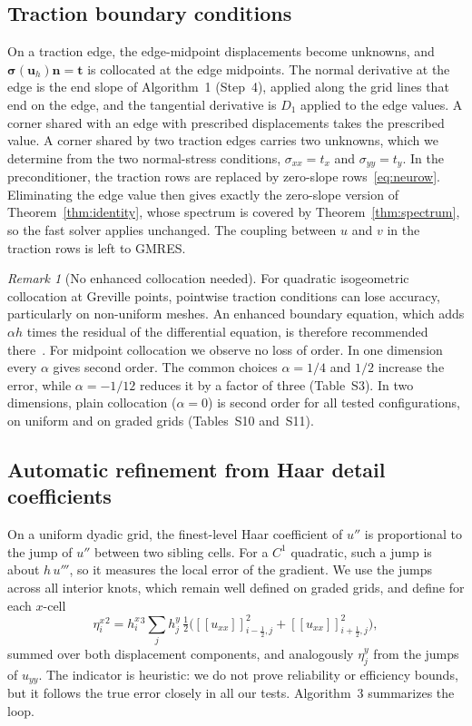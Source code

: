\documentclass[preprint,12pt]{elsarticle}
\theoremstyle{remark}
\newtheorem{remark}{Remark}
\begin{document}
\subsection{Traction boundary conditions}\label{sec:traction}
On a traction edge, the edge-midpoint displacements become unknowns, and
$\boldsymbol\sigma(\mathbf u_h)\mathbf n=\mathbf t$ is collocated at the edge midpoints. The normal
derivative at the edge is the end slope of Algorithm~1 (Step~4), applied along the grid lines that end
on the edge, and the tangential derivative is $D_1$ applied to the edge values. A corner shared with an
edge with prescribed displacements takes the prescribed value. A corner shared by two traction edges
carries two unknowns, which we determine from the two normal-stress conditions, $\sigma_{xx}=t_x$ and
$\sigma_{yy}=t_y$. In the preconditioner, the traction rows are replaced by zero-slope
rows~\eqref{eq:neurow}. Eliminating the edge value then gives exactly the zero-slope version of
Theorem~\ref{thm:identity}, whose spectrum is covered by Theorem~\ref{thm:spectrum}, so the fast solver
applies unchanged. The coupling between $u$ and $v$ in the traction rows is left to GMRES.

\begin{remark}[No enhanced collocation needed]
For quadratic isogeometric collocation at Greville points, pointwise traction conditions can lose
accuracy, particularly on non-uniform meshes. An enhanced boundary equation, which adds $\alpha h$ times
the residual of the differential equation, is therefore recommended there~\cite{delorenzis2015isogeometric}.
For midpoint collocation we observe no loss of order. In one dimension every $\alpha$ gives second order.
The common choices $\alpha=1/4$ and $1/2$ increase the error, while $\alpha=-1/12$ reduces it by a factor
of three (Table~S3). In two dimensions, plain collocation ($\alpha=0$) is second order for all
tested configurations, on uniform and on graded grids (Tables~S10
and~S11).
\end{remark}

\subsection{Automatic refinement from Haar detail coefficients}\label{sec:adapt}
On a uniform dyadic grid, the finest-level Haar coefficient of $u''$ is proportional to the jump of $u''$
between two sibling cells. For a $C^1$ quadratic, such a jump is about $h\,u'''$, so it measures the local
error of the gradient. We use the jumps across all interior knots, which remain well defined on graded
grids, and define for each $x$-cell
\begin{equation}\label{eq:indicator}
\eta^x_i{}^2=h^x_i{}^3\sum_jh^y_j\,\tfrac12\Big([\![u_{xx}]\!]_{i-\frac12,j}^2+[\![u_{xx}]\!]_{i+\frac12,j}^2\Big),
\end{equation}
summed over both displacement components, and analogously $\eta^y_j$ from the jumps of $u_{yy}$. The
indicator is heuristic: we do not prove reliability or efficiency bounds, but it follows the true error
closely in all our tests. Algorithm~3 summarizes the loop.
\end{document}
